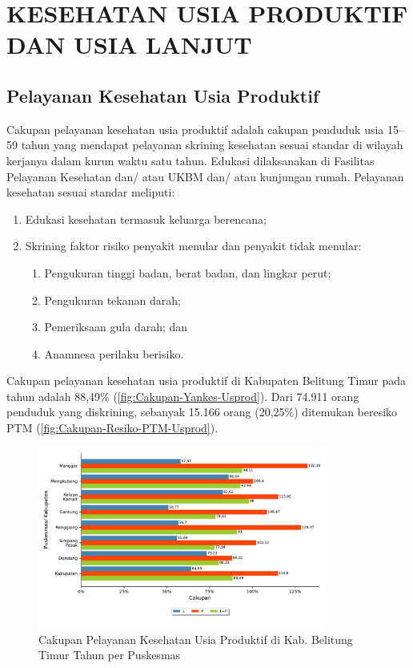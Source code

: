 \section[USIPRO DAN USILA]{KESEHATAN USIA PRODUKTIF DAN USIA LANJUT}
\subsection{Pelayanan Kesehatan Usia Produktif}
Cakupan pelayanan kesehatan usia produktif adalah cakupan penduduk usia 15–59 tahun yang mendapat pelayanan skrining kesehatan sesuai standar di wilayah kerjanya dalam kurun waktu satu tahun. Edukasi dilaksanakan di Fasilitas Pelayanan Kesehatan dan/ atau UKBM dan/ atau kunjungan rumah. Pelayanan kesehatan sesuai standar meliputi:
\begin{enumerate}
  \item Edukasi kesehatan termasuk keluarga berencana;
  \item Skrining faktor risiko penyakit menular dan penyakit tidak menular:
  \begin{enumerate}
    \item Pengukuran tinggi badan, berat badan, dan lingkar perut;
    \item Pengukuran tekanan darah;
    \item Pemeriksaan gula darah; dan
    \item Anamnesa perilaku berisiko.
  \end{enumerate}
\end{enumerate}

Cakupan pelayanan kesehatan usia produktif di Kabupaten Belitung Timur pada tahun \tP adalah 88,49\% (\autoref{fig:Cakupan-Yankes-Usprod}).
Dari 74.911 orang penduduk yang diskrining, sebanyak 15.166 orang (20,25\%) ditemukan beresiko PTM (\autoref{fig:Cakupan-Resiko-PTM-Usprod}).

\begin{figure}[H]
    \centering
    \includegraphics[width=0.85\textwidth]{bab_05/bab_05_28_skriningProduktif_a}
    \caption{Cakupan Pelayanan Kesehatan Usia Produktif di Kab. Belitung Timur Tahun \tP per Puskesmas}
    \label{fig:Cakupan-Yankes-Usprod}
\end{figure}

